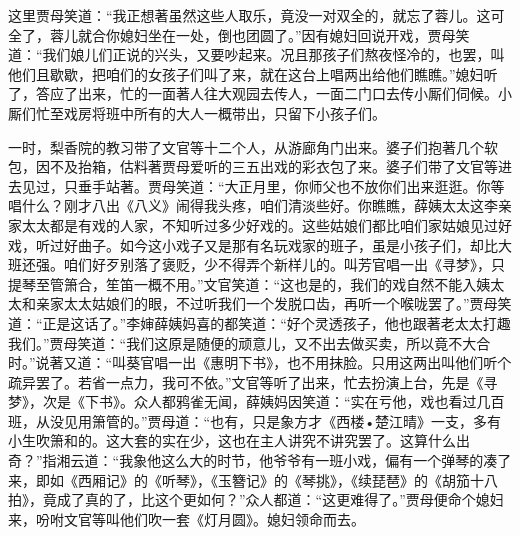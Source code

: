 \begin{parag}
    这里贾母笑道：“我正想著虽然这些人取乐，竟没一对双全的，就忘了蓉儿。这可全了，蓉儿就合你媳妇坐在一处，倒也团圆了。”因有媳妇回说开戏，贾母笑道：“我们娘儿们正说的兴头，又要吵起来。况且那孩子们熬夜怪冷的，也罢，叫他们且歇歇，把咱们的女孩子们叫了来，就在这台上唱两出给他们瞧瞧。”媳妇听了，答应了出来，忙的一面著人往大观园去传人，一面二门口去传小厮们伺候。小厮们忙至戏房将班中所有的大人一概带出，只留下小孩子们。
\end{parag}


\begin{parag}
    一时，梨香院的教习带了文官等十二个人，从游廊角门出来。婆子们抱著几个软包，因不及抬箱，估料著贾母爱听的三五出戏的彩衣包了来。婆子们带了文官等进去见过，只垂手站著。贾母笑道：“大正月里，你师父也不放你们出来逛逛。你等唱什么？刚才八出《八义》闹得我头疼，咱们清淡些好。你瞧瞧，薛姨太太这李亲家太太都是有戏的人家，不知听过多少好戏的。这些姑娘们都比咱们家姑娘见过好戏，听过好曲子。如今这小戏子又是那有名玩戏家的班子，虽是小孩子们，却比大班还强。咱们好歹别落了褒贬，少不得弄个新样儿的。叫芳官唱一出《寻梦》，只提琴至管箫合，笙笛一概不用。”文官笑道：“这也是的，我们的戏自然不能入姨太太和亲家太太姑娘们的眼，不过听我们一个发脱口齿，再听一个喉咙罢了。”贾母笑道：“正是这话了。”李婶薛姨妈喜的都笑道：“好个灵透孩子，他也跟著老太太打趣我们。”贾母笑道：“我们这原是随便的顽意儿，又不出去做买卖，所以竟不大合时。”说著又道：“叫葵官唱一出《惠明下书》，也不用抹脸。只用这两出叫他们听个疏异罢了。若省一点力，我可不依。”文官等听了出来，忙去扮演上台，先是《寻梦》，次是《下书》。众人都鸦雀无闻，薛姨妈因笑道：“实在亏他，戏也看过几百班，从没见用箫管的。”贾母道：“也有，只是象方才《西楼•楚江晴》一支，多有小生吹箫和的。这大套的实在少，这也在主人讲究不讲究罢了。这算什么出奇？”指湘云道：“我象他这么大的时节，他爷爷有一班小戏，偏有一个弹琴的凑了来，即如《西厢记》的《听琴》，《玉簪记》的《琴挑》，《续琵琶》的《胡笳十八拍》，竟成了真的了，比这个更如何？”众人都道：“这更难得了。”贾母便命个媳妇来，吩咐文官等叫他们吹一套《灯月圆》。媳妇领命而去。
\end{parag}


